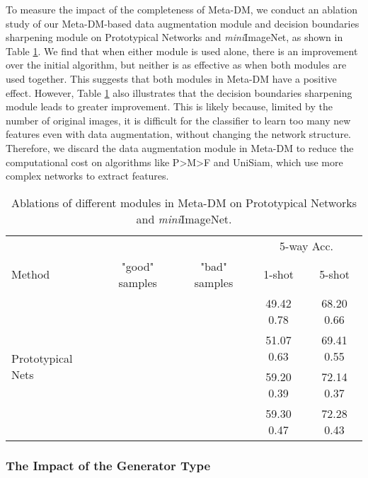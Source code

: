 \documentclass{article}
\begin{document}
To measure the impact of the completeness of Meta-DM, we conduct an ablation study of our Meta-DM-based data augmentation module and decision boundaries sharpening module on Prototypical Networks and \textit{mini}ImageNet, as shown in Table \ref{table6}. We find that when either module is used alone, there is an improvement over the initial algorithm, but neither is as effective as when both modules are used together. This suggests that both modules in Meta-DM have a positive effect. However, Table \ref{table6} also illustrates that the decision boundaries sharpening module leads to greater improvement. This is likely because, limited by the number of original images, it is difficult for the classifier to learn too many new features even with data augmentation, without changing the network structure. Therefore, we discard the data augmentation module in Meta-DM to reduce the computational cost on algorithms like P>M>F and UniSiam, which use more complex networks to extract features.


\begin{table}
	\caption{Ablations of different modules in Meta-DM on Prototypical Networks and \textit{mini}ImageNet. }
	\centering
	\begin{tabular}{lcccc}
		\toprule
		& & & \multicolumn{2}{c}{5-way Acc.}  \\
		Method  & "good" samples   & "bad" samples & 1-shot& 5-shot \\
		\midrule
		\multirow{4}{*}{Prototypical Nets \cite{i1}}  & & & 49.42  0.78  & 68.20  0.66  \\
		 & \checkmark & &  51.07  0.63  & 69.41  0.55  \\
		 &  & \checkmark &  59.20  0.39  & 72.14  0.37  \\
		 & \checkmark & \checkmark &  59.30  0.47  & 72.28  0.43  \\
		\bottomrule
	\end{tabular}
	\label{table6}
\end{table}


\subsubsection{The Impact of the Generator Type}
\end{document}

